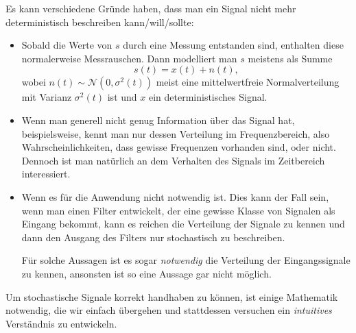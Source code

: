 Es kann verschiedene Gr\"unde haben, dass man ein Signal nicht mehr deterministisch beschreiben kann/will/sollte:

\begin{itemize}
    \item Sobald die Werte von $s$ durch eine Messung entstanden sind, enthalten diese normalerweise Messrauschen.
    Dann modelliert man $s$ meistens als Summe
    \[
    s(t) = x(t) + n(t),
    \]
    wobei $n(t) \sim \mathcal{N}(0, \sigma^2(t))$ meist eine mittelwertfreie Normalverteilung mit Varianz $\sigma^2(t)$ ist und $x$ ein deterministisches Signal.
    \item Wenn man generell nicht genug Information \"uber das Signal hat, beispielsweise, kennt man nur dessen Verteilung im Frequenzbereich, also Wahrscheinlichkeiten, dass gewisse Frequenzen vorhanden sind, oder nicht.
    Dennoch ist man nat\"urlich an dem Verhalten des Signals im Zeitbereich interessiert.
    \item Wenn es f\"ur die Anwendung nicht notwendig ist.
    Dies kann der Fall sein, wenn man einen Filter entwickelt, der eine gewisse Klasse von Signalen als Eingang bekommt, kann es reichen die Verteilung der Signale zu kennen und dann den Ausgang des Filters nur stochastisch zu beschreiben.


    F\"ur solche Aussagen ist es sogar \emph{notwendig} die Verteilung der Eingangssignale zu kennen, ansonsten ist so eine Aussage gar nicht m\"oglich.
\end{itemize}



Um stochastische Signale korrekt handhaben zu k\"onnen, ist einige Mathematik notwendig, die wir einfach \"ubergehen und stattdessen versuchen ein \emph{intuitives} Verst\"andnis zu entwickeln.
%
%
